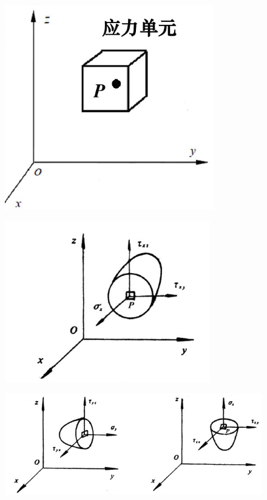 \documentclass[12pt,a4paper]{article}
\begin{document}
\begin{figure}[H]
\centering
\includegraphics[scale=0.4]{./figures/3.png}
\caption{}
\end{figure}

\begin{figure}[H]
\centering
\includegraphics[scale=0.5]{./figures/4.png}
\caption{}
\end{figure}

\begin{figure}[H]
\centering
\includegraphics[scale=0.5]{./figures/5.png}
\caption{}
\end{figure}
\end{document}

